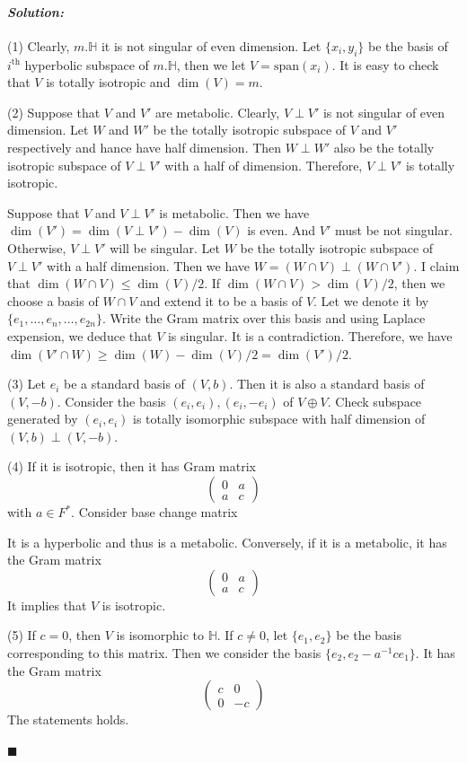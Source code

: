 \documentclass[12pt, a4paper]{article}
\newenvironment{solution}
  {\paragraph{\textit{Solution:}}\par\medskip}
  {\hfill$\blacksquare$\vspace{0.1cm}}
\begin{document}
\begin{solution}
    (1) Clearly, $m.\mathbb{H}$ it is not singular of even dimension. Let $\{x_i,y_i\}$ be the basis of $i^{\text{th}}$ hyperbolic subspace of $m.\mathbb{H}$,
    then we let $V=\text{span}(x_i)$. It is easy to check that $V$ is totally isotropic and $\dim(V)=m$.

    (2) Suppose that $V$ and $V'$ are metabolic. Clearly, $V\perp V'$ is not singular of even dimension. Let $W$ and $W'$ be the totally isotropic subspace of $V$ and $V'$ respectively and 
    hance have half dimension. Then $W\perp W'$ also be the totally isotropic subspace of $V\perp V'$ with a half of dimension. Therefore, $V\perp V'$ is totally isotropic.

    Suppose that $V$ and $V\perp V'$ is metabolic. Then we have $\dim(V')= \dim(V\perp V')-\dim(V)$ is even.
    And $V'$ must be not singular. Otherwise, $V\perp V'$ will be singular. Let $W$ be the totally isotropic subspace of $V\perp V'$ with a half dimension.
    Then we have $W = (W\cap V)\perp (W\cap V')$. I claim that $\dim(W\cap V)\le \dim(V)/2$. If $\dim(W\cap V)> \dim(V)/2$, then we choose a basis of $W\cap V$ and extend it to be a basis of $V$.
    Let we denote it by $\{e_1,\dots,e_n,\dots,e_{2n}\}$. Write the Gram matrix over this basis and using Laplace expension, we deduce that $V$ is singular.
    It is a contradiction. Therefore, we have $\dim(V'\cap W)\ge \dim(W)-\dim(V)/2 = \dim(V')/2$.
    
    (3) Let $e_i$ be a standard basis of $(V,b)$. Then it is also a standard basis of $(V,-b)$. 
    Consider the basis $(e_i,e_i),(e_i,-e_i)$ of $V\oplus V$. Check subspace generated by $(e_i,e_i)$ is totally isomorphic subspace with half dimension of $(V,b)\perp (V,-b)$.

    (4) If it is isotropic, then it has Gram matrix $$ \begin{pmatrix} 0 & a \\ a & c \end{pmatrix} $$ with $a\in F^*$. 
    Consider base change matrix 
    
    It is a hyperbolic and thus is a metabolic.
    Conversely, if it is a metabolic, it has the Gram matrix $$ \begin{pmatrix} 0 & a \\ a & c \end{pmatrix} $$
    It implies that $V$ is isotropic.

    (5) If $c=0$, then $V$ is isomorphic to $\mathbb{H}$. If $c\neq 0$, let $\{e_1,e_2\}$ be the basis corresponding to this matrix.
    Then we consider the basis $\{e_2,e_2-a^{-1}ce_1\}$. It has the Gram matrix
    $$ \begin{pmatrix} c & 0 \\ 0 & -c \end{pmatrix} $$
    The statements holds.


\end{solution}
\end{document}
